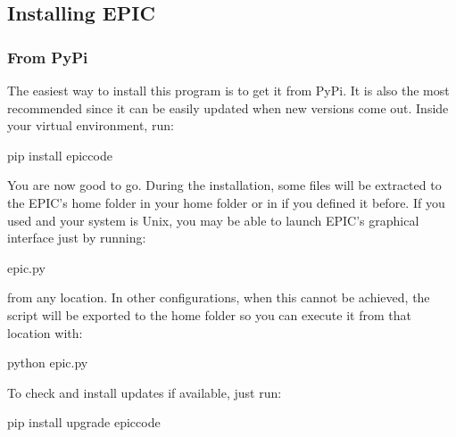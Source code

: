 \documentclass[letterpaper,12pt,english]{sphinxhowto}
\begin{document}
\subsection{Installing EPIC}
\label{\detokenize{howtoinstall:installing-epic}}

\subsubsection{From PyPi}
\label{\detokenize{howtoinstall:from-pypi}}
The easiest way to install this program is to get it from PyPi.
It is also the most recommended since it can be easily updated when new
versions come out.
Inside your virtual environment, run:

%
\begin{sphinxVerbatim}[commandchars=\\\{\}]
\PYGZdl{} pip install epic\PYGZhy{}code
\end{sphinxVerbatim}

You are now good to go.
During the installation, some  files will be extracted to the EPIC’s home folder in your home folder or in  if you defined it before.
If you used  and your system is Unix, you may be able to launch EPIC’s
graphical interface just by running:

%
\begin{sphinxVerbatim}[commandchars=\\\{\}]
\PYGZdl{} epic.py
\end{sphinxVerbatim}

from any location. In other configurations, when this cannot be achieved, the
script  will be exported to the home folder so you can execute it
from that location with:

%
\begin{sphinxVerbatim}[commandchars=\\\{\}]
\PYGZdl{} python epic.py
\end{sphinxVerbatim}

To check and install updates if available, just run:

%
\begin{sphinxVerbatim}[commandchars=\\\{\}]
\PYGZdl{} pip install \PYGZhy{}\PYGZhy{}upgrade epic\PYGZhy{}code
\end{sphinxVerbatim}
\end{document}
